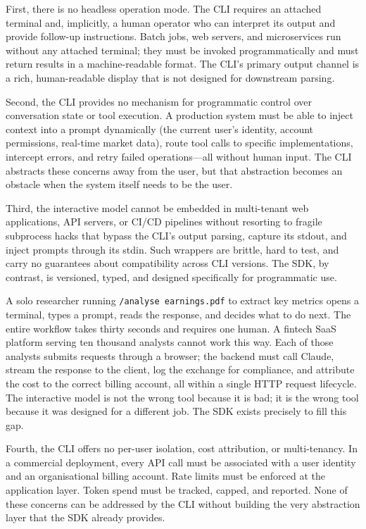 First, there is no headless operation mode. The CLI requires an attached terminal and,
implicitly, a human operator who can interpret its output and provide follow-up
instructions. Batch jobs, web servers, and microservices run without any attached
terminal; they must be invoked programmatically and must return results in a
machine-readable format. The CLI's primary output channel is a rich, human-readable
display that is not designed for downstream parsing.

Second, the CLI provides no mechanism for programmatic control over conversation state
or tool execution. A production system must be able to inject context into a prompt
dynamically (the current user's identity, account permissions, real-time market data),
route tool calls to specific implementations, intercept errors, and retry failed
operations---all without human input. The CLI abstracts these concerns away from the
user, but that abstraction becomes an obstacle when the system itself needs to be the
user.

Third, the interactive model cannot be embedded in multi-tenant web applications, API
servers, or CI/CD pipelines without resorting to fragile subprocess hacks that bypass
the CLI's output parsing, capture its stdout, and inject prompts through its stdin.
Such wrappers are brittle, hard to test, and carry no guarantees about compatibility
across CLI versions. The SDK, by contrast, is versioned, typed, and designed
specifically for programmatic use.

\begin{context}
A solo researcher running \texttt{/analyse earnings.pdf} to extract key metrics opens a
terminal, types a prompt, reads the response, and decides what to do next. The entire
workflow takes thirty seconds and requires one human. A fintech SaaS platform serving
ten thousand analysts cannot work this way. Each of those analysts submits requests
through a browser; the backend must call Claude, stream the response to the client,
log the exchange for compliance, and attribute the cost to the correct billing account,
all within a single HTTP request lifecycle. The interactive model is not the wrong tool
because it is bad; it is the wrong tool because it was designed for a different job.
The SDK exists precisely to fill this gap.
\end{context}

Fourth, the CLI offers no per-user isolation, cost attribution, or multi-tenancy. In a
commercial deployment, every API call must be associated with a user identity and an
organisational billing account. Rate limits must be enforced at the application layer.
Token spend must be tracked, capped, and reported. None of these concerns can be
addressed by the CLI without building the very abstraction layer that the SDK already
provides.

